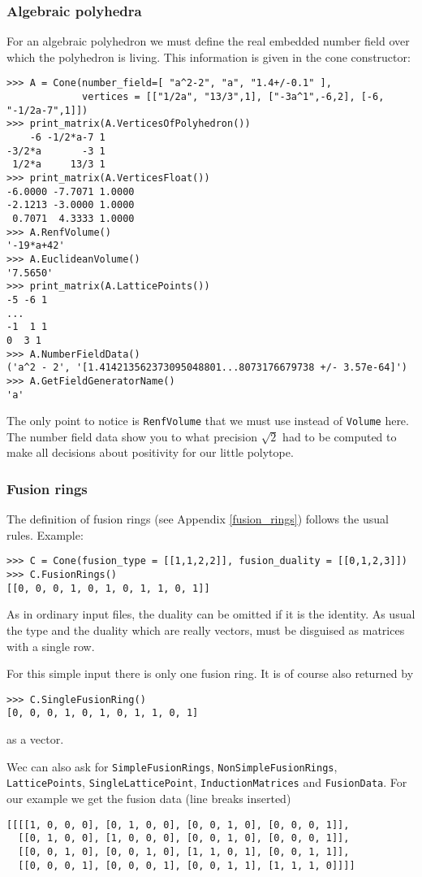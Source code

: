 \begin{small}
\subsubsection{Algebraic polyhedra}

For an algebraic polyhedron we must define the real embedded number field over which the polyhedron is living. This information is given in the cone constructor:
\begin{Verbatim}
>>> A = Cone(number_field=[ "a^2-2", "a", "1.4+/-0.1" ], 
             vertices = [["1/2a", "13/3",1], ["-3a^1",-6,2], [-6, "-1/2a-7",1]])
>>> print_matrix(A.VerticesOfPolyhedron())
    -6 -1/2*a-7 1
-3/2*a       -3 1
 1/2*a     13/3 1
>>> print_matrix(A.VerticesFloat())
-6.0000 -7.7071 1.0000
-2.1213 -3.0000 1.0000
 0.7071  4.3333 1.0000
>>> A.RenfVolume()
'-19*a+42'
>>> A.EuclideanVolume()
'7.5650'
>>> print_matrix(A.LatticePoints())
-5 -6 1
...
-1  1 1
0  3 1
>>> A.NumberFieldData()
('a^2 - 2', '[1.414213562373095048801...8073176679738 +/- 3.57e-64]')
>>> A.GetFieldGeneratorName()
'a'
\end{Verbatim}

The only point to notice is \verb|RenfVolume| that we must use instead of \verb|Volume| here. The number field data show you to what precision $\sqrt2$ had to be computed to make all decisions about positivity for our little polytope.

\subsubsection{Fusion rings}

The definition of fusion rings (see Appendix \ref{fusion_rings}) follows the usual rules. Example:
\begin{Verbatim}
>>> C = Cone(fusion_type = [[1,1,2,2]], fusion_duality = [[0,1,2,3]])
>>> C.FusionRings()
[[0, 0, 0, 1, 0, 1, 0, 1, 1, 0, 1]]
\end{Verbatim}
As in ordinary input files, the duality can be omitted if it is the identity. As usual the type and the duality which are really vectors, must be disguised as matrices with a single row.

For this simple input there is only one fusion ring. It is of course also returned by 
\begin{Verbatim}
>>> C.SingleFusionRing()
[0, 0, 0, 1, 0, 1, 0, 1, 1, 0, 1]
\end{Verbatim} 
as a vector.

Wec can also ask for \verb*|SimpleFusionRings|, \verb*|NonSimpleFusionRings|, \verb*|LatticePoints|, \verb*|SingleLatticePoint|, \verb*|InductionMatrices| and \verb*|FusionData|. For our example we get the fusion data (line breaks inserted) 
\begin{Verbatim}
[[[[1, 0, 0, 0], [0, 1, 0, 0], [0, 0, 1, 0], [0, 0, 0, 1]],
  [[0, 1, 0, 0], [1, 0, 0, 0], [0, 0, 1, 0], [0, 0, 0, 1]],
  [[0, 0, 1, 0], [0, 0, 1, 0], [1, 1, 0, 1], [0, 0, 1, 1]],
  [[0, 0, 0, 1], [0, 0, 0, 1], [0, 0, 1, 1], [1, 1, 1, 0]]]]
\end{Verbatim}


\end{small}
